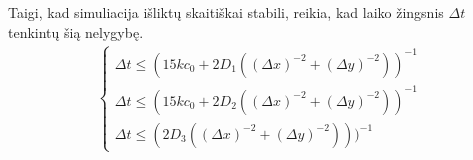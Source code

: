 Taigi, kad simuliacija išliktų skaitiškai stabili, reikia, kad laiko žingsnis $\Delta t$ tenkintų šią nelygybę.
\begin{align} \label{numerical-stability-condition}
  \begin{cases}
    \Delta t \leqslant (15kc_0+2D_1((\Delta x)^{-2}+(\Delta y)^{-2}))^{-1}\\
    \Delta t \leqslant (15kc_0+2D_2((\Delta x)^{-2}+(\Delta y)^{-2}))^{-1}\\
    \Delta t \leqslant (2D_3((\Delta x)^{-2}+(\Delta y)^{-2})))^{-1}
  \end{cases}
\end{align}

